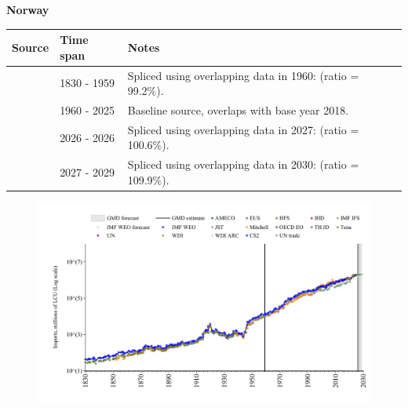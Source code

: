 \documentclass[12pt,a4paper,landscape]{article}
\begin{document}
\begin{adjustbox}{max totalsize={\paperwidth}{\paperheight},center}
\begin{minipage}[t][\textheight][t]{\textwidth}
\vspace*{0.5cm}
{}
\begin{center}
{\Large\bfseries Norway}
\end{center}
\vspace{0.5cm}
\begin{table}[H]
\centering
\small
\begin{tabular}{|l|l|l|}
\hline
\textbf{Source} & \textbf{Time span} & \textbf{Notes} \\
\hline
\rowcolor{white}\cite{CS2_NOR}& 1830 - 1959 &Spliced using overlapping data in 1960: (ratio = 99.2\%).\\
\rowcolor{lightgray}\cite{OECD_EO}& 1960 - 2025 &Baseline source, overlaps with base year 2018.\\
\rowcolor{white}\cite{AMECO}& 2026 - 2026 &Spliced using overlapping data in 2027: (ratio = 100.6\%).\\
\rowcolor{lightgray}\cite{IMF_WEO_forecast}& 2027 - 2029 &Spliced using overlapping data in 2030: (ratio = 109.9\%).\\
\hline
\end{tabular}
\end{table}
\begin{figure}[H]
\centering
\includegraphics[width=\textwidth,height=0.6\textheight,keepaspectratio]{graphs/NOR_imports.pdf}
\end{figure}
\end{minipage}
\end{adjustbox}
\end{document}

